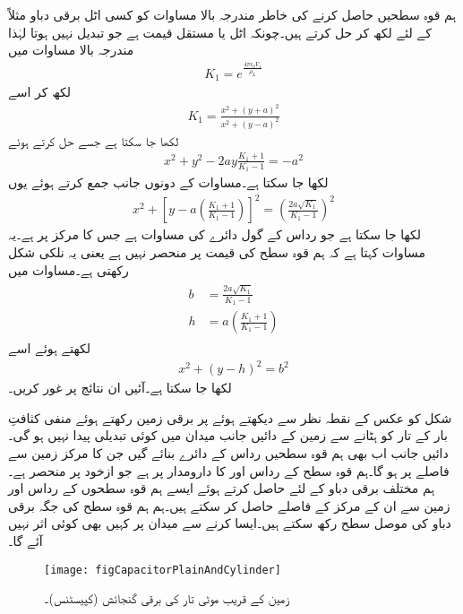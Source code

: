 ہم قوہ سطحیں حاصل کرنے کی خاطر مندرجہ بالا مساوات کو کسی اٹل برقی دباو مثلاً  کے لئے لکھ کر حل کرتے ہیں۔چونکہ  اٹل یا مستقل قیمت ہے جو تبدیل نہیں ہوتا لہٰذا مندرجہ بالا مساوات میں
\begin{align}\label{مساوات_کپیسٹر_زمین_موٹی_تار_جزوی_مستقل}
K_1=e^{\frac{4\pi\epsilon_0 V_1}{\rho_L}}
\end{align}
لکھ کر اسے 
\begin{align*}
K_1=\frac{x^2+(y+a)^2}{x^2+(y-a)^2}
\end{align*}
لکھا جا سکتا ہے جسے حل کرتے ہوئے
\begin{align*}
x^2+y^2-2ay \frac{K_1+1}{K_1-1} =-a^2
\end{align*}
لکھا جا سکتا ہے۔مساوات کے دونوں جانب  جمع کرتے ہوئے یوں
\begin{align}\label{مساوات_کپیسٹر_دو_تار_کپیسٹر_بنیادی}
x^2+\left[y-a\left(\frac{K_1+1}{K_1-1}\right) \right]^2=\left(\frac{2a\sqrt{K_1}}{K_1-1} \right)^2
\end{align}
لکھا جا سکتا ہے جو رداس  کے  گول دائرے کی مساوات ہے جس کا مرکز  پر ہے۔یہ مساوات کہتا ہے کہ ہم قوہ سطح  کی قیمت پر منحصر نہیں ہے یعنی یہ نلکی شکل رکھتی ہے۔مساوات  میں
\begin{gather}
\begin{aligned}\label{مساوات_کپیسٹر_رداس_زمین_سے_فاصلہ}
b&=\frac{2a\sqrt{K_1}}{K_1-1}\\
h&=a\left(\frac{K_1+1}{K_1-1}\right)
\end{aligned}
\end{gather}
لکھتے ہوئے اسے
\begin{align}\label{مساوات_کپیسٹر_دو_تار_کپیسٹر_عمومی_شکل}
x^2+(y-h)^2=b^2
\end{align}
لکھا جا سکتا ہے۔آئیں ان نتائج پر غور کریں۔

شکل  کو عکس کے نقطہ نظر سے دیکھتے  ہوئے  پر برقی زمین رکھتے ہوئے  منفی کثافتِ بار کے تار کو ہٹانے سے زمین کے دائیں جانب میدان میں کوئی تبدیلی پیدا نہیں ہو گی۔دائیں جانب اب بھی ہم قوہ سطحیں  رداس کے دائرے بنائے گیں جن کا مرکز زمین سے  فاصلے پر ہو گا۔ہم قوہ سطح کے رداس اور  کا دارومدار  پر ہے جو ازخود  پر منحصر ہے۔ہم مختلف برقی دباو  کے لئے  حاصل کرتے ہوئے ایسے ہم قوہ سطحوں کے رداس اور زمین سے  ان کے مرکز کے فاصلے حاصل کر سکتے ہیں۔ہم  ہم قوہ سطح کی جگہ  برقی دباو کی موصل سطح رکھ سکتے ہیں۔ایسا کرنے سے میدان پر کہیں بھی کوئی اثر نہیں آئے گا۔ 
\begin{figure}
\centering
\texttt{[image: figCapacitorPlainAndCylinder]}
\caption{زمین کے قریب موٹی تار کی برقی گنجائش (کپیسٹنس)۔}
\label{شکل_کپیسٹر_زمین_کے_قریب_موٹی_تار}
\end{figure}

